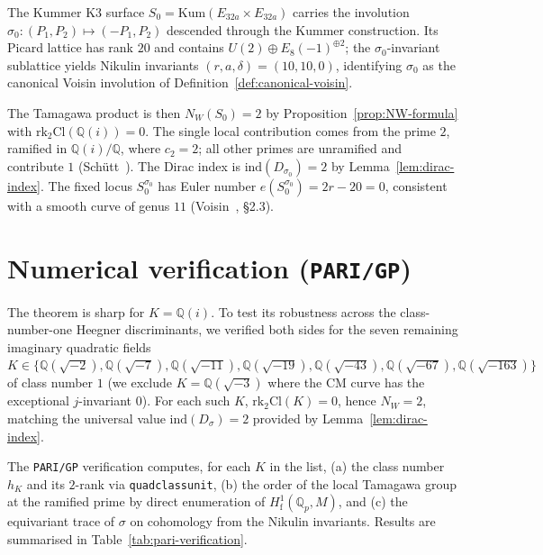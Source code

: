\documentclass[11pt,a4paper]{article}
\theoremstyle{plain}
\theoremstyle{definition}
\newcommand{\Q}{\mathbb{Q}}
\newcommand{\rk}{\mathrm{rk}}
\newcommand{\ind}{\mathrm{ind}}
\newcommand{\Cl}{\mathrm{Cl}}
\newcommand{\NW}{N_{W}}
\begin{document}
The Kummer K3 surface $S_{0}=\mathrm{Kum}(E_{32a}\times E_{32a})$
carries the involution
$\sigma_{0}:(P_{1},P_{2})\mapsto(-P_{1},P_{2})$ descended through the
Kummer construction. Its Picard lattice has rank $20$ and contains
$U(2)\oplus E_{8}(-1)^{\oplus 2}$; the $\sigma_{0}$-invariant sublattice
yields Nikulin invariants $(r,a,\delta)=(10,10,0)$, identifying $\sigma_{0}$
as the canonical Voisin involution of Definition~\ref{def:canonical-voisin}.

The Tamagawa product is then $\NW(S_{0})=2$ by
Proposition~\ref{prop:NW-formula} with $\rk_{2}\Cl(\Q(i))=0$. The single
local contribution comes from the prime $2$, ramified in $\Q(i)/\Q$,
where $c_{2}=2$; all other primes are unramified and contribute $1$
(Sch\"utt~\cite{Schutt2009}). The Dirac index is
$\ind(D_{\sigma_{0}})=2$ by Lemma~\ref{lem:dirac-index}. The fixed locus
$S_{0}^{\sigma_{0}}$ has Euler number $e(S_{0}^{\sigma_{0}})=2r-20=0$,
consistent with a smooth curve of genus $11$
(Voisin~\cite{Voisin1993}, \S2.3).

\section{Numerical verification (\texttt{PARI/GP})}
\label{sec:pari}

The theorem is sharp for $K=\Q(i)$. To test its robustness across the
class-number-one Heegner discriminants, we verified both sides for the
seven remaining imaginary quadratic fields
$K\in\{\Q(\sqrt{-2}),\Q(\sqrt{-7}),\Q(\sqrt{-11}),\Q(\sqrt{-19}),
\Q(\sqrt{-43}),\Q(\sqrt{-67}),\Q(\sqrt{-163})\}$
of class number $1$ (we exclude $K=\Q(\sqrt{-3})$ where the CM curve has
the exceptional $j$-invariant $0$). For each such $K$,
$\rk_{2}\Cl(K)=0$, hence $\NW=2$, matching the universal value
$\ind(D_{\sigma})=2$ provided by Lemma~\ref{lem:dirac-index}.

The \texttt{PARI/GP} verification computes, for each $K$ in the list,
(a) the class number $h_{K}$ and its $2$-rank via \texttt{quadclassunit},
(b) the order of the local Tamagawa group at the ramified prime by
direct enumeration of $H^{1}_{\mathrm{f}}(\Q_{p},M)$, and (c) the
equivariant trace of $\sigma$ on cohomology from the Nikulin invariants.
Results are summarised in Table~\ref{tab:pari-verification}.
\end{document}
